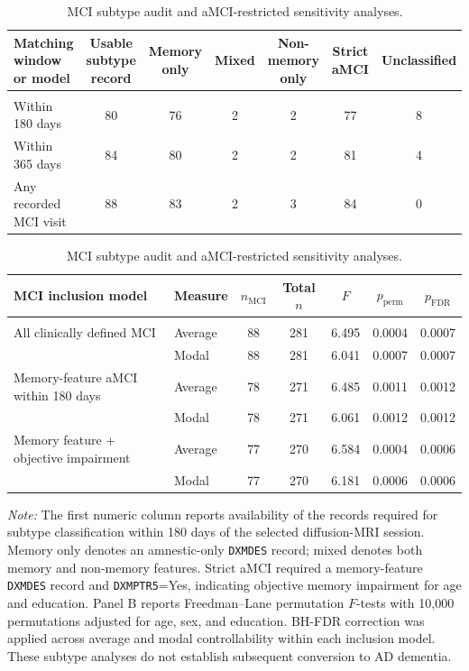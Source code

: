 \documentclass{article}
\begin{document}
\begin{table}[!htbp]
\centering
\caption{MCI subtype audit and aMCI-restricted sensitivity analyses.}
\label{tab:tableS1}
\footnotesize
\setlength{\tabcolsep}{3.5pt}
\renewcommand{\arraystretch}{1.10}
\begin{tabularx}{\textwidth}{@{}>{\raggedright\arraybackslash}Xcccccc@{}}
\toprule
\textbf{Matching window or model} &
\textbf{Usable subtype record} &
\textbf{Memory only} &
\textbf{Mixed} &
\textbf{Non-memory only} &
\textbf{Strict aMCI} &
\textbf{Unclassified}\\
\midrule
\multicolumn{7}{l}{\textbf{A. MCI subtype audit}}\\
Within 180 days & 80 & 76 & 2 & 2 & 77 & 8\\
Within 365 days & 84 & 80 & 2 & 2 & 81 & 4\\
Any recorded MCI visit & 88 & 83 & 2 & 3 & 84 & 0\\
\bottomrule
\end{tabularx}

\vspace{3mm}
\begin{tabularx}{\textwidth}{@{}>{\raggedright\arraybackslash}Xlccccc@{}}
\toprule
\textbf{MCI inclusion model} &
\textbf{Measure} &
\textbf{\(n_{\mathrm{MCI}}\)} &
\textbf{Total \(n\)} &
\textbf{\(F\)} &
\textbf{\(p_{\mathrm{perm}}\)} &
\textbf{\(p_{\mathrm{FDR}}\)}\\
\midrule
\multicolumn{7}{l}{\textbf{B. Clinical-group sensitivity analyses}}\\
All clinically defined MCI
 & Average & 88 & 281 & 6.495 & 0.0004 & 0.0007\\
 & Modal   & 88 & 281 & 6.041 & 0.0007 & 0.0007\\
\addlinespace
Memory-feature aMCI within 180 days
 & Average & 78 & 271 & 6.485 & 0.0011 & 0.0012\\
 & Modal   & 78 & 271 & 6.061 & 0.0012 & 0.0012\\
\addlinespace
Memory feature + objective impairment
 & Average & 77 & 270 & 6.584 & 0.0004 & 0.0006\\
 & Modal   & 77 & 270 & 6.181 & 0.0006 & 0.0006\\
\bottomrule
\end{tabularx}

\vspace{1mm}
\footnotesize{\textit{Note:} The first numeric column reports availability of the records required for subtype classification within 180 days of the selected diffusion-MRI session. Memory only denotes an amnestic-only \texttt{DXMDES} record; mixed denotes both memory and non-memory features. Strict aMCI required a memory-feature \texttt{DXMDES} record and \texttt{DXMPTR5}=Yes, indicating objective memory impairment for age and education. Panel B reports Freedman--Lane permutation \(F\)-tests with 10,000 permutations adjusted for age, sex, and education. BH-FDR correction was applied across average and modal controllability within each inclusion model. These subtype analyses do not establish subsequent conversion to AD dementia.}
\end{table}
\end{document}
